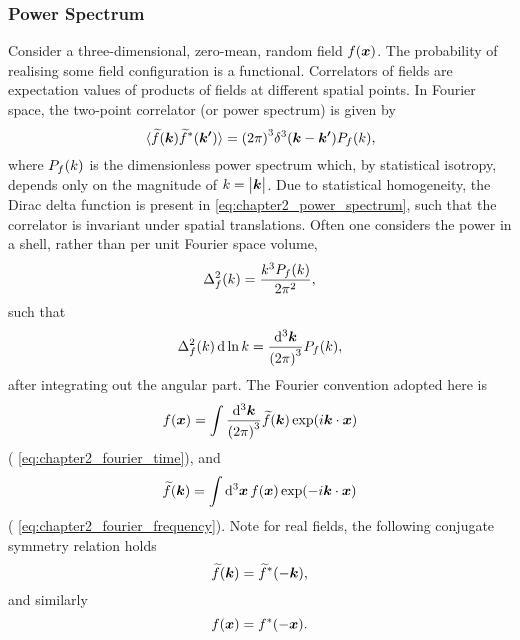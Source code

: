 \subsubsection{Power Spectrum}

Consider a three-dimensional, zero-mean, random field \(f(\vb*{x})\).
The probability of realising some field configuration is a functional.
Correlators of fields are expectation values of products of fields at different spatial points.
In Fourier space, the two-point correlator (or power spectrum) is given by
%
\begin{equation}\label{eq:chapter2_power_spectrum}
	\expval*{\widetilde{f}(\vb*{k}) \widetilde{f}^{\ast}(\vb*{k'})}
	= {(2\pi)}^{3} \delta^{3}(\vb*{k} - \vb*{k'}) P_{f}(k),
\end{equation}
%
where \(P_{f}(k)\) is the dimensionless power spectrum which, by statistical isotropy, depends only on the magnitude of \(k=\big\lvert\vb*{k}\big\rvert\).
Due to statistical homogeneity, the Dirac delta function is present in \cref{eq:chapter2_power_spectrum}, such that the correlator is invariant under spatial translations.
Often one considers the power in a shell, rather than per unit Fourier space volume, \ie{}
%
\begin{equation}\label{eq:chapter2_power_shell}
	\Delta_{f}^{2}(k)
	= \frac{k^{3}P_{f}(k)}{2\pi^{2}},
\end{equation}
%
such that
%
\begin{equation}
	\Delta_{f}^{2}(k) \dd{\ln{k}}
	= \frac{\dd[3]{\vb*{k}}}{{(2\pi)}^{3}} P_{f}(k),
\end{equation}
%
after integrating out the angular part.
The Fourier convention adopted here is
%
\begin{equation}
	f(\vb*{x})
	= \int\frac{\dd[3]{\vb*{k}}}{{(2\pi)}^{3}} \widetilde{f}(\vb*{k}) \exp(i\vb*{k}\cdot\vb*{x})
\end{equation}
%
(\cf{} \cref{eq:chapter2_fourier_time}), and
%
\begin{equation}
	\widetilde{f}(\vb*{k})
	= \int\dd[3]{\vb*{x}} f(\vb*{x}) \exp(-i\vb*{k}\cdot\vb*{x})
\end{equation}
%
(\cf{} \cref{eq:chapter2_fourier_frequency}).
Note for real fields, the following conjugate symmetry relation holds
%
\begin{equation}
	\widetilde{f}(\vb*{k})
	= \widetilde{f}^{\ast}(-\vb*{k}),
\end{equation}
%
and similarly
%
\begin{equation}
	f(\vb*{x})
	= f^{\ast}(-\vb*{x}).
\end{equation}

